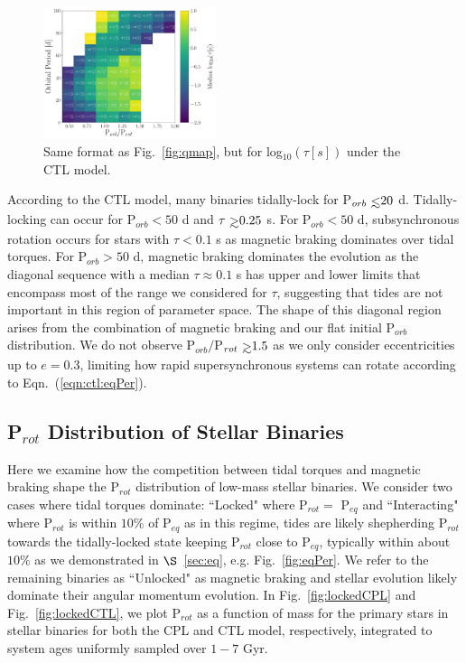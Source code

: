 \documentclass[twocolumn]{aastex61}
\def\gsim{~\rlap{$>$}{\lower 1.0ex\hbox{$\sim$}}}
\def\lsim{~\rlap{$<$}{\lower 1.0ex\hbox{$\sim$}}}
\begin{document}
\begin{figure}
	\includegraphics[width=0.45\textwidth]{../Plots/porbProtPorbTauHist.pdf}
   \caption{Same format as Fig.~\ref{fig:qmap}, but for log$_{10}(\tau [s])$ under the CTL model. }%
    \label{fig:taumap}%
\end{figure}

According to the CTL model, many binaries tidally-lock for P$_{orb} \lsim 20$ d. Tidally-locking can occur for P$_{orb} < 50$ d and $\tau \gsim 0.25$ s.  For P$_{orb} < 50$ d, subsynchronous rotation occurs for stars with $\tau < 0.1$ s as magnetic braking dominates over tidal torques.  For P$_{orb} > 50$ d, magnetic braking dominates the evolution as the diagonal sequence with a median $\tau \approx 0.1$ s has upper and lower limits that encompass most of the range we considered for $\tau$, suggesting that tides are not important in this region of parameter space.  The shape of this diagonal region arises from the combination of magnetic braking and our flat initial P$_{orb}$ distribution. We do not observe P$_{orb}/$P$_{rot} \gsim 1.5$ as we only consider eccentricities up to $e = 0.3$, limiting how rapid supersynchronous systems can rotate according to Eqn.~(\ref{eqn:ctl:eqPer}).

\subsection{P$_{rot}$ Distribution of Stellar Binaries} \label{sec:protDist}

Here we examine how the competition between tidal torques and magnetic braking shape the P$_{rot}$ distribution of low-mass stellar binaries.  We consider two cases where tidal torques dominate: ``Locked" where P$_{rot} = $ P$_{eq}$ and ``Interacting" where P$_{rot}$ is within $10\%$ of P$_{eq}$ as in this regime, tides are likely shepherding P$_{rot}$ towards the tidally-locked state keeping P$_{rot}$ close to P$_{eq}$, typically within about $10\%$ as we demonstrated in $\S$~\ref{sec:eq}, e.g. Fig.~\ref{fig:eqPer}. We refer to the remaining binaries as ``Unlocked" as magnetic braking and stellar evolution likely dominate their angular momentum evolution.  In Fig.~\ref{fig:lockedCPL} and Fig.~\ref{fig:lockedCTL}, we plot P$_{rot}$ as a function of mass for the primary stars in stellar binaries for both the CPL and CTL model, respectively, integrated to system ages uniformly sampled over $1-7$ Gyr.  
\end{document}
